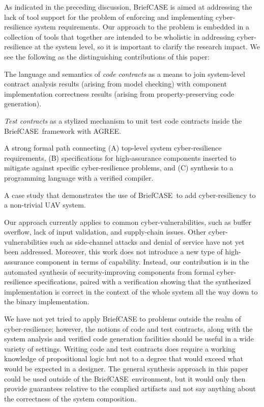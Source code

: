 \documentclass[global,twocolumn]{svjour}
\newcommand{\brfcs}{BriefCASE}
\newcommand{\agr}{AGREE}
\begin{document}
As indicated in the preceding discussion, {\brfcs} is aimed at addressing the lack of tool support for the problem of enforcing and implementing cyber-resilience system requirements.
%
Our approach to the problem is embedded in a collection of tools that together are intended to be wholistic in addressing cyber-resilience at the system level, so it is important to clarify the
research impact.
%
We see the following as the distinguishing contributions of this paper:
\begin{compactitem}
  \item The language and semantics of \emph{code contracts} as a means to join system-level contract analysis results (arising from model checking) with component implementation correctness results (arising from property-preserving code generation).
  \item \emph{Test contracts} as a stylized mechanism to unit test code contracts inside the \brfcs\ framework with \agr.
  \item A strong formal path connecting (A) top-level system cyber-resilience requirements, (B) specifications for high-assurance components inserted to mitigate against specific cyber-resilience problems, and (C) synthesis to a programming language with a verified compiler.
  \item A case study that demonstrates the use of \brfcs\ to add cyber-resiliency to a non-trivial UAV system.
\end{compactitem}

Our approach currently applies to common cyber-vulnerabilities, such as buffer overflow, lack of input validation, and supply-chain issues.
%
Other cyber-vulnerabilities such as side-channel attacks and denial of service have not yet been addressed. Moreover, this work does not introduce a new type of high-assurance component in terms of capability.
%
Instead, our contribution is in the automated synthesis of security-improving components from formal cyber-resilience specifications, paired with a verification showing that the synthesized implementation is correct in the context of the whole system all the way down to the binary implementation.

We have not yet tried to apply {\brfcs} to problems outside the realm of cyber-resilience;
%
however, the notions of code and test contracts, along with the system analysis and verified code generation facilities should be useful in a wide variety of settings.
%
Writing code and test contracts does require a working knowledge of propositional logic but not to a degree that would exceed what would be expected in a designer.
%
The general synthesis approach in this paper could be used outside of the \brfcs\ environment, but it would only then provide guarantees relative to the complied artifacts and not say anything about the correctness of the system composition.
\end{document}
